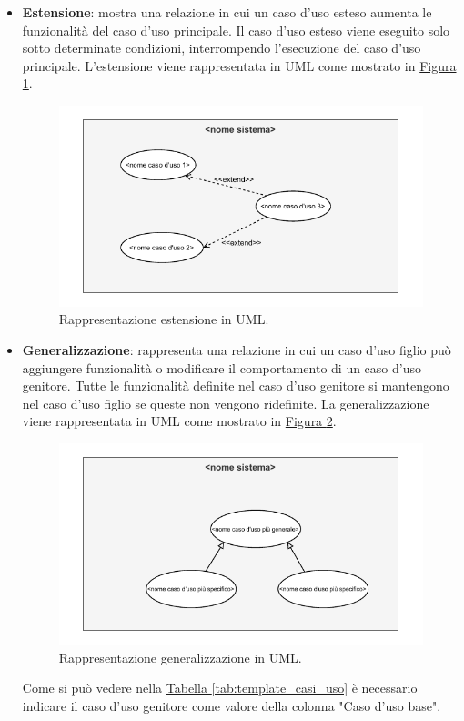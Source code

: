 \begin{itemize}
\begin{itemize}
        \item \textbf{Estensione}: mostra una relazione in cui un caso d'uso esteso aumenta le funzionalità del caso d'uso principale. Il caso d'uso esteso viene eseguito solo sotto determinate condizioni, interrompendo l'esecuzione del caso d'uso principale.
        L'estensione viene rappresentata in UML come mostrato in \hyperref[fig:estensione_uml]{Figura \ref{fig:estensione_uml}}.
        \begin{figure}[!h]
            \centering
            \includegraphics{Sezioni/ProcessiPrimari/Immagini/estensione_uml.pdf}
            \caption{Rappresentazione estensione in UML.}
            \label{fig:estensione_uml}
        \end{figure}
        
        \item \textbf{Generalizzazione}: rappresenta una relazione in cui un caso d'uso figlio può aggiungere funzionalità o modificare il comportamento di un caso d'uso genitore. Tutte le funzionalità definite nel caso d'uso genitore si mantengono nel caso d'uso figlio se queste non vengono ridefinite.
        La generalizzazione viene rappresentata in UML come mostrato in \hyperref[fig:generalizzazione_uml]{Figura \ref{fig:generalizzazione_uml}}.
        \begin{figure}[!h]
            \centering
            \includegraphics{Sezioni/ProcessiPrimari/Immagini/generalizzazione_uml.pdf}
            \caption{Rappresentazione generalizzazione in UML.}
            \label{fig:generalizzazione_uml}
        \end{figure}
        Come si può vedere nella \hyperref[tab:template_casi_uso]{Tabella \ref{tab:template_casi_uso}} è necessario indicare il caso d'uso genitore come valore della colonna "Caso d'uso base".


\end{itemize}
\end{itemize}

